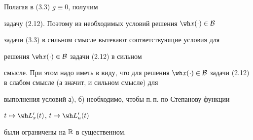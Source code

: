 \begin{notes}

Полагая в (3.3) $g\equiv 0$, получим

задачу (2.12). Поэтому из необходимых условий решения $\wh x(\cdot)\in\cal B$

задачи (3.3) в сильном смысле вытекают соответствующие условия для

решения $\wh x(\cdot)\in\cal B$ задачи (2.12) в сильном

смысле. При этом надо иметь в виду, что для решения $\wh x(\cdot)\in\cal

B$ задачи (2.12) в слабом смысле (а значит, и сильном смысле) для 

выполнения условий а), б) необходимо, чтобы п.\,п. по Степанову функции

$t\mapsto \wh L'_{x}(t)$, $t\mapsto\wh L'_{u}(t)$

были ограничены на $\Bbb R$ в существенном.

\end{notes}




